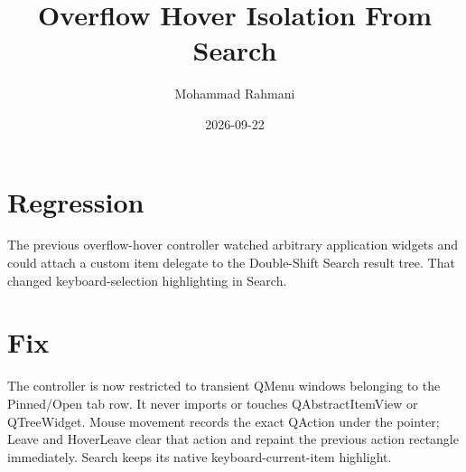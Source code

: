 \documentclass[a4paper]{article}
\title{Overflow Hover Isolation From Search}
\date{2026-09-22}
\author{Mohammad Rahmani}
\begin{document}
   \maketitle

   \begin{preview}
      \section{Regression}
      The previous overflow-hover controller watched arbitrary application
      widgets and could attach a custom item delegate to the Double-Shift
      Search result tree. That changed keyboard-selection highlighting in
      Search.

      \section{Fix}
      The controller is now restricted to transient QMenu windows belonging to
      the Pinned/Open tab row. It never imports or touches QAbstractItemView or
      QTreeWidget. Mouse movement records the exact QAction under the pointer;
      Leave and HoverLeave clear that action and repaint the previous action
      rectangle immediately. Search keeps its native keyboard-current-item
      highlight.
   \end{preview}

   
   
\end{document}
